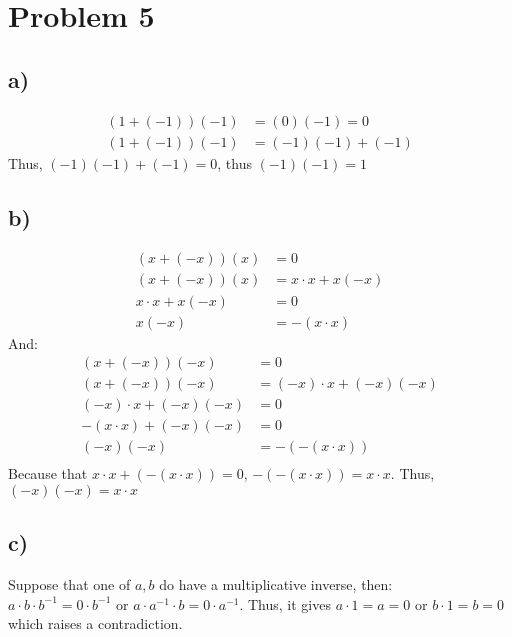 \documentclass{article}
\begin{document}
\section*{Problem 5}
\subsection*{a)}
\begin{align*}
    (1+(-1))(-1)&=(0)(-1)=0\\
    (1+(-1))(-1)&=(-1)(-1)+(-1)
\end{align*}
Thus, \((-1)(-1)+(-1)=0\), thus \((-1)(-1)=1\)
\subsection*{b)}
\begin{align*}
    (x+(-x))(x)&=0\\
    (x+(-x))(x)&=x\cdot x+x(-x)\\
    x\cdot x+x(-x)&=0\\
    x(-x)&=-(x\cdot x)
\end{align*}
And:\\
\begin{align*}
    (x+(-x))(-x)&=0\\
    (x+(-x))(-x)&=(-x)\cdot x+(-x)(-x)\\
    (-x)\cdot x+(-x)(-x)&=0\\
    -(x\cdot x)+(-x)(-x)&=0\\
    (-x)(-x)&=-(-(x\cdot x))\\
\end{align*}
Because that \(x\cdot x +(-(x\cdot x))=0\), \(-(-(x\cdot x))=x\cdot x\).
Thus, \((-x)(-x)=x\cdot x\)
\subsection*{c)}
Suppose that one of \(a,b\) do have a multiplicative inverse, then:\\
 \(a\cdot b \cdot b^{-1}=0\cdot b^{-1}\) or \(a\cdot a^{-1} \cdot b=0\cdot a^{-1}\).
 Thus, it gives \(a\cdot 1=a=0\) or \(b\cdot 1 = b=0\) which raises a contradiction.
\end{document}
